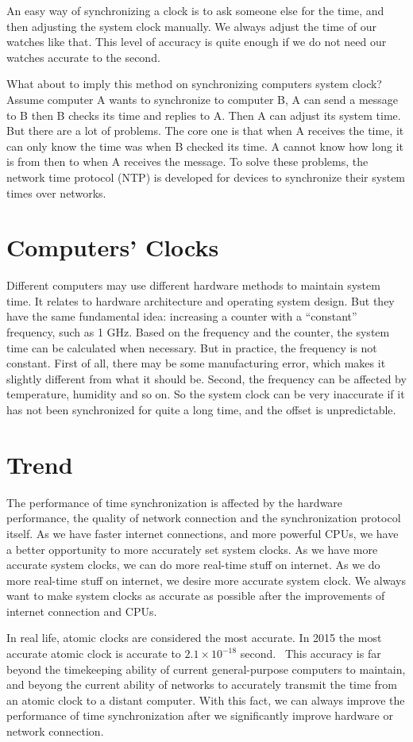 An easy way of synchronizing a clock is to ask someone else for the time, and
then adjusting the system clock manually. We always adjust the time of our
watches like that. This level of  accuracy is quite enough if we do not need
our watches accurate to the second. 

What about to imply this method on synchronizing computers system clock? Assume
computer A wants to synchronize to computer B, A can send a message to B then B
checks its time and replies to A\null. Then A can adjust its system time.  
But there are a lot of problems.  The core one is that when A receives
the time, it can only know the time was when B checked its time. A cannot know
how long it is from then to when A receives the message. To solve these
problems, the network time protocol (NTP) is developed for devices to
synchronize their system times over networks. 

\section{Computers' Clocks}
\label{sec:computers_clocks}
Different computers may use different hardware methods to maintain system time.
It relates to hardware architecture and operating system design. But they have
the same fundamental idea: increasing a counter with a ``constant'' frequency,
such as 1 GHz.
Based on the frequency and the counter, the system time can be calculated
when necessary. But in practice, the frequency is not constant. First of all,
there may be some manufacturing error, which makes it slightly different from
what it should be. Second, the frequency can be affected by temperature,
humidity and so on. So the system clock can be very inaccurate if it has not
been synchronized for quite a long time, and the offset is unpredictable.

\section{Trend}
\label{sec:trend}
The performance of time synchronization is affected by the hardware
performance, the quality of network connection and the synchronization protocol
itself. 
As we have faster internet connections, and more powerful CPUs, we have a
better opportunity to more accurately set system clocks. As we have more
accurate system clocks, we can do more real-time stuff on internet. As we do
more real-time stuff on internet, we desire more accurate system clock. We
always want to make system clocks as accurate as possible after the
improvements of internet connection and CPUs. 

In real life, atomic clocks are considered the most accurate. In 2015 the most
accurate atomic clock is accurate to $2.1\times 10^{-18}$
second.~\cite{atomic_clock} 
This accuracy is far beyond the timekeeping ability of current general-purpose
computers to maintain, and beyong the current ability of networks to accurately
transmit the time from an atomic clock to a distant computer. With this fact,
we can always improve the performance of time synchronization after we
significantly improve hardware or network connection.
